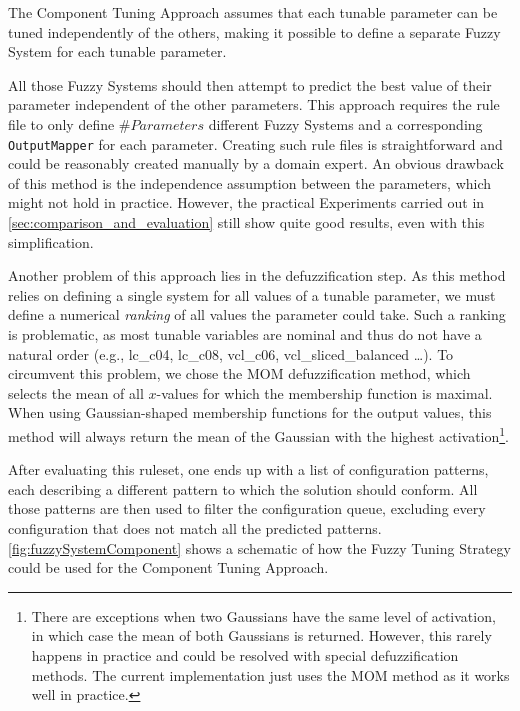 The Component Tuning Approach assumes that each tunable parameter can be tuned independently of the others, making it possible to define a separate Fuzzy System for each tunable parameter.

All those Fuzzy Systems should then attempt to predict the best value of their parameter independent of the other parameters. This approach requires the rule file to only define $\#Parameters$ different Fuzzy Systems and a corresponding \texttt{OutputMapper} for each parameter. Creating such rule files is straightforward and could be reasonably created manually by a domain expert. An obvious drawback of this method is the independence assumption between the parameters, which might not hold in practice. However, the practical Experiments carried out in \autoref{sec:comparison_and_evaluation} still show quite good results, even with this simplification.

Another problem of this approach lies in the defuzzification step. As this method relies on defining a single system for all values of a tunable parameter, we must define a numerical \emph{ranking} of all values the parameter could take. Such a ranking is problematic, as most tunable variables are nominal and thus do not have a natural order (e.g., lc\_c04, lc\_c08, vcl\_c06, vcl\_sliced\_balanced \dots ). To circumvent this problem, we chose the MOM defuzzification method, which selects the mean of all $x$-values for which the membership function is maximal. When using Gaussian-shaped membership functions for the output values, this method will always return the mean of the Gaussian with the highest activation\footnote{There are exceptions when two Gaussians have the same level of activation, in which case the mean of both Gaussians is returned. However, this rarely happens in practice and could be resolved with special defuzzification methods. The current implementation just uses the MOM method as it works well in practice.}.

After evaluating this ruleset, one ends up with a list of configuration patterns, each describing a different pattern to which the solution should conform. All those patterns are then used to filter the configuration queue, excluding every configuration that does not match all the predicted patterns. \autoref{fig:fuzzySystemComponent} shows a schematic of how the Fuzzy Tuning Strategy could be used for the Component Tuning Approach.


